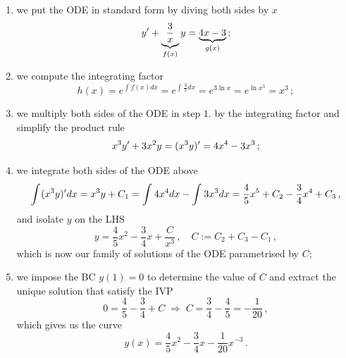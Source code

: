 \documentclass[../main.tex]{subfiles}
\begin{document}
\begin{example_continued}
     \begin{enumerate}
          \item we put the ODE in standard form by diving both sides by $x$
                  \begin{equation*}
                          y' + \underbrace{\frac{3}{x}}_{f(x)}y = \underbrace{4x - 3}_{g(x)}\,;
                  \end{equation*}
          \item we compute the integrating factor
                  \begin{equation*}
                       h(x) = e^{\int_{}^{}f(x)dx} = e^{\int_{}^{}\frac{3}{x}dx} = e^{3\ln x} = e^{\ln x^{3}} = x^{3}\,;
                  \end{equation*}
          \item we multiply both sides of the ODE in step $1.$ by the integrating factor and simplify the product rule
                  \begin{equation*}
                       x^{3}y'+3x^{2}y = (x^{3}y)' = 4x^{4} - 3x^{3}\,;
                  \end{equation*}
          \item we integrate both sides of the ODE above 
                  \begin{equation*}
                       \int_{}^{}(x^{3}y)'dx = x^{3}y + C_{1} = \int_{}^{}4x^{4}dx - \int_{}^{}3x^{3}dx = \frac{4}{5}x^{5} + C_{2} - \frac{3}{4}x^{4} + C_{3}\,,
                  \end{equation*}
                  and isolate $y$ on the LHS
                  \begin{equation*}
                       y = \frac{4}{5}x^{2} - \frac{3}{4}x + \frac{C}{x^{3}}\,,\quad C:=C_{2}+C_{3}-C_{1}\,,
                  \end{equation*}
                  which is now our family of solutions of the ODE parametrised by $C$;
          \item we impose the BC $y(1)=0$ to determine the value of $C$ and extract the unique solution that satisfy the IVP 
                  \begin{equation*}
                       0 = \frac{4}{5} - \frac{3}{4} + C \; \Rightarrow \; C = \frac{3}{4} - \frac{4}{5} = -\frac{1}{20}\,, 
                  \end{equation*}
                which gives us the curve
                  \begin{equation*}
                       y(x) =  \frac{4}{5}x^{2} - \frac{3}{4}x - \frac{1}{20}x^{-3}\,.
                  \end{equation*}
     \end{enumerate} 
\end{example_continued}
\end{document}
